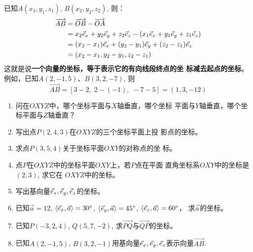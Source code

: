 \begin{figure}[htp]
    \centering
{}
    \caption{}
\end{figure}

已知$A(x_1,y_1,z_1)$, $B(x_2,y_2,z_2)$, 则：
\[\begin{split}
   \overrightarrow{AB}&=\overrightarrow{OB}-\overrightarrow{OA}\\
&=x_2\vec{e}_x+y_2\vec{e}_y+z_2\vec{e}_z-(x_1\vec{e}_x+y_1\vec{e}_y+z_1\vec{e}_z)\\
&=(x_2-x_1)\vec{e}_x+(y_2-y_1)\vec{e}_y+(z_2-z_1)\vec{e}_z\\
&=(x_2-x_1, y_2-y_1, z_2-z_1)
\end{split}\]
这就是说\textbf{一个向量的坐标，等于表示它的有向线段终点的坐
标减去起点的坐标}。例如，已知$A(2,-1,5)$、$B(3,
2,-7)$, 则
\[\Vec{AB}=[3-2,\; 2-(-1),\; -7-5]=(1,3,-12)\]

\begin{ex}
\begin{enumerate}
    \item 问在$OXYZ$中，哪个坐标平面与$X$轴垂直，哪个坐标
    平面与$Y$轴垂直，哪个坐标平面与$Z$轴垂直？
    \item 写出点$P(2,4,3)$在$OXYZ$的三个坐标平面上投
    影点的坐标。
    \item 求点$P(3,5,4)$关于坐标平面$OXY$的对称点的坐
    标。
    \item 点$P$在$OXYZ$中的坐标平面$OXY$上，若$P$点在平面
    直角坐标系$OXY$中的坐标是$(2,3)$, 求它在
    $OXYZ$中的坐标。
    \item 写出基向量$\vec{e}_x,\vec{e}_y,\vec{e}_z$的坐标。
    \item 已知$\vec{a}=12$, $\langle\vec{e}_x ,\vec{a}\rangle=30^{\circ}$, $\langle\vec{e}_y ,\vec{a}\rangle=45^{\circ}$, $\langle\vec{e}_z ,\vec{a}\rangle=60^{\circ}$，
求$\vec{a}$的坐标。
    \item 已知$P(-3,2,4)$, $Q(5,7,-2)$, 求$\Vec{PQ}$与$\Vec{QP}$的坐标。
    \item 已知$A(2,-1,5)$, $B(3,2,-1)$用基向量$\vec{e}_x,\vec{e}_y,\vec{e}_z$表示向量$\Vec{AB}$.
\end{enumerate}
\end{ex}

